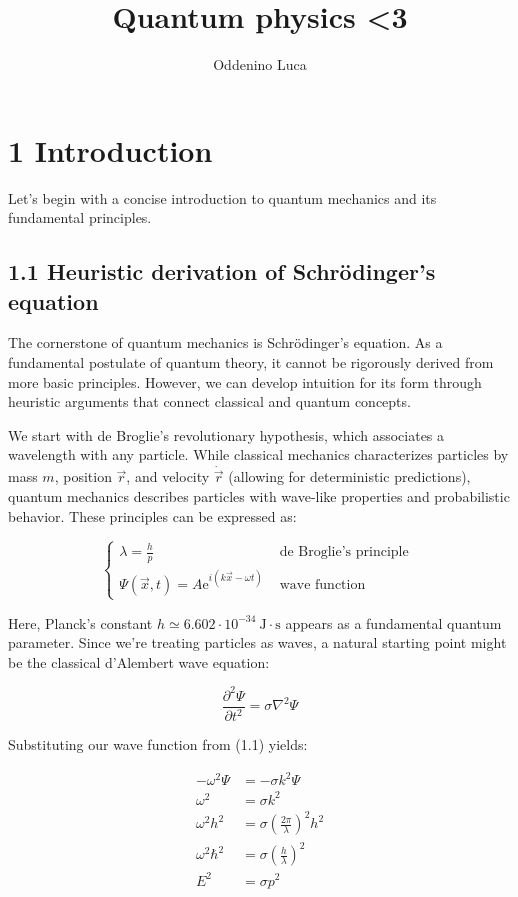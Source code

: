 \documentclass[10pt]{article}
\title{Quantum physics <3}
\author{Oddenino Luca }
\date{}
\begin{document}
\maketitle
\captionsetup{singlelinecheck=false}

\section*{1 Introduction}
Let's begin with a concise introduction to quantum mechanics and its fundamental principles.

\subsection*{1.1 Heuristic derivation of Schrödinger's equation}
The cornerstone of quantum mechanics is Schrödinger's equation. As a fundamental postulate of quantum theory, it cannot be rigorously derived from more basic principles. However, we can develop intuition for its form through heuristic arguments that connect classical and quantum concepts.

We start with de Broglie's revolutionary hypothesis, which associates a wavelength with any particle. While classical mechanics characterizes particles by mass $m$, position $\vec{r}$, and velocity $\dot{\vec{r}}$ (allowing for deterministic predictions), quantum mechanics describes particles with wave-like properties and probabilistic behavior. These principles can be expressed as:

\[
\begin{cases}\lambda=\frac{h}{p} & \text { de Broglie's principle }  \tag{1.1}\\ \Psi(\vec{x}, t)=A \mathrm{e}^{i(k \vec{x}-\omega t)} & \text { wave function }\end{cases}
\]

Here, Planck's constant $h \simeq 6.602 \cdot 10^{-34} \mathrm{~J} \cdot \mathrm{s}$ appears as a fundamental quantum parameter. Since we're treating particles as waves, a natural starting point might be the classical d'Alembert wave equation:

\begin{equation*}
\frac{\partial^{2} \Psi}{\partial t^{2}}=\sigma \nabla^{2} \Psi \tag{1.2}
\end{equation*}

Substituting our wave function from (1.1) yields:

\begin{align*}
-\omega^{2} \Psi & =-\sigma k^{2} \Psi \\
\omega^{2} & =\sigma k^{2} \\
\omega^{2} h^{2} & =\sigma\left(\frac{2 \pi}{\lambda}\right)^{2} h^{2}  \tag{1.3}\\
\omega^{2} \hbar^{2} & =\sigma\left(\frac{h}{\lambda}\right)^{2} \\
E^{2} & =\sigma p^{2}
\end{align*}
\end{document}
